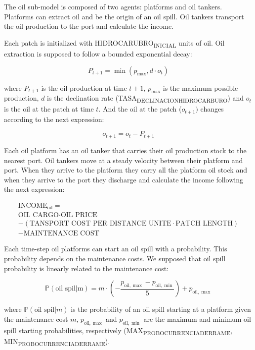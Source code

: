\documentclass[11pt]{article}
\begin{document}
The oil sub-model is composed of two agents: platforms and oil tankers. Platforms can extract oil and be the origin of an oil spill. Oil tankers transport the oil production to the port and calculate the income.

Each patch is initialized with HIDROCARUBRO\textsubscript{INICIAL} units of oil. Oil extraction is supposed to follow a bounded exponential decay:

\[ P_{t+1} = \min ( p_{\max} , d \cdot o_t ) \]

where \(P_{t+1}\) is the oil production at time \(t+1\), \(p_\max\) is the maximum possible production, \(d\) is the declination rate (TASA\textsubscript{DECLINACION}\textsubscript{HIDROCARBURO}) and \(o_t\) is the oil at the patch at time \(t\). And the oil at the patch (\(o_{t+1})\) changes according to the next expression:

\[ o_{t+1} = o_t - P_{t+1} \]

Each oil platform has an oil tanker that carries their oil production stock to the nearest port. Oil tankers move at a steady velocity between their platform and port. When they arrive to the platform they carry all the platform oil stock and when they arrive to the port they discharge and calculate the income following the next expression:

\begin{align*}
\text{INCOME}_{\text{oil}} =  \\
\text{OIL CARGO} \cdot \text{OIL PRICE}  \\
 - (\text{TANSPORT COST PER DISTANCE UNITE} \cdot \text{PATCH LENGTH}) \\
 - \text{MAINTENANCE COST}
   \end{align*}

Each time-step oil platforms can start an oil spill with a probability. This probability depends on the maintenance costs. We supposed that oil spill probability is linearly related to the maintenance cost:

\[ \mathbb{P}(\text{oil spil} | \text{m}) = m \cdot \left( -  \frac{p_{\text{oil},\max} - p_{\text{oil},\min}}{5} \right) + p_{\text{oil},\max} \]

where \(\mathbb{P}(\text{oil spil}|m)\) is the probability of an oil spill starting at a platform given the maintenance cost \(m\), \(p_{\text{oil},\max}\) and \(p_{\text{oil},\min}\) are the maximum and minimum oil spill starting probabilities, respectively (MAX\textsubscript{PROB}\textsubscript{OCURRENCIA}\textsubscript{DERRAME}, MIN\textsubscript{PROB}\textsubscript{OCURRENCIA}\textsubscript{DERRAME}).
\end{document}
